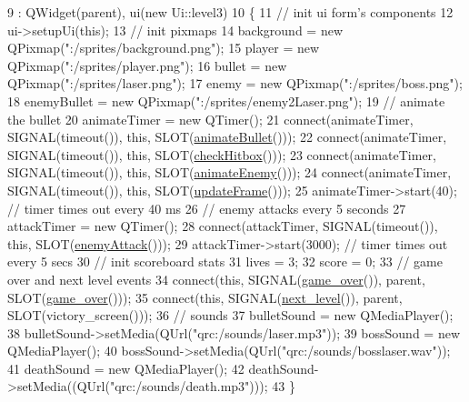 \begin{DoxyCode}
9                               : QWidget(parent), ui(\textcolor{keyword}{new} Ui::level3)
10 \{
11     \textcolor{comment}{// init ui form's components}
12     ui->setupUi(\textcolor{keyword}{this});
13     \textcolor{comment}{// init pixmaps}
14     background = \textcolor{keyword}{new} QPixmap(\textcolor{stringliteral}{":/sprites/background.png"});
15     player = \textcolor{keyword}{new} QPixmap(\textcolor{stringliteral}{":/sprites/player.png"});
16     bullet = \textcolor{keyword}{new} QPixmap(\textcolor{stringliteral}{":/sprites/laser.png"});
17     enemy = \textcolor{keyword}{new} QPixmap(\textcolor{stringliteral}{":/sprites/boss.png"});
18     enemyBullet = \textcolor{keyword}{new} QPixmap(\textcolor{stringliteral}{":/sprites/enemy2Laser.png"});
19     \textcolor{comment}{// animate the bullet}
20     animateTimer = \textcolor{keyword}{new} QTimer();
21     connect(animateTimer, SIGNAL(timeout()), \textcolor{keyword}{this}, SLOT(\hyperlink{classlevel3_a83c0241cb42c34c707758adff87a4b49}{animateBullet}()));
22     connect(animateTimer, SIGNAL(timeout()), \textcolor{keyword}{this}, SLOT(\hyperlink{classlevel3_a8b8f7f12a1fcafc61cb61d73c82ff900}{checkHitbox}()));
23     connect(animateTimer, SIGNAL(timeout()), \textcolor{keyword}{this}, SLOT(\hyperlink{classlevel3_ab413227813899b1d0aefa085ede06df0}{animateEnemy}()));
24     connect(animateTimer, SIGNAL(timeout()), \textcolor{keyword}{this}, SLOT(\hyperlink{classlevel3_a1829c75ea73f9cd85d508609dc07e6d6}{updateFrame}()));
25     animateTimer->start(40); \textcolor{comment}{// timer times out every 40 ms}
26     \textcolor{comment}{// enemy attacks every 5 seconds}
27     attackTimer = \textcolor{keyword}{new} QTimer();
28     connect(attackTimer, SIGNAL(timeout()), \textcolor{keyword}{this}, SLOT(\hyperlink{classlevel3_aa47d3689ec8f682435ac51d8bb01917d}{enemyAttack}()));
29     attackTimer->start(3000); \textcolor{comment}{// timer times out every 5 secs}
30     \textcolor{comment}{// init scoreboard stats}
31     lives = 3;
32     score = 0;
33     \textcolor{comment}{// game over and next level events}
34     connect(\textcolor{keyword}{this}, SIGNAL(\hyperlink{classlevel3_a66c2c618d5faf6c54ab1e88d88496c19}{game\_over}()), parent, SLOT(\hyperlink{classlevel3_a66c2c618d5faf6c54ab1e88d88496c19}{game\_over}()));
35     connect(\textcolor{keyword}{this}, SIGNAL(\hyperlink{classlevel3_a40dafa1371eb8b9f736cfa94d4d7fde6}{next\_level}()), parent, SLOT(victory\_screen()));
36     \textcolor{comment}{// sounds}
37     bulletSound = \textcolor{keyword}{new} QMediaPlayer();
38     bulletSound->setMedia(QUrl(\textcolor{stringliteral}{"qrc:/sounds/laser.mp3"}));
39     bossSound = \textcolor{keyword}{new} QMediaPlayer();
40     bossSound->setMedia(QUrl(\textcolor{stringliteral}{"qrc:/sounds/bosslaser.wav"}));
41     deathSound = \textcolor{keyword}{new} QMediaPlayer();
42     deathSound->setMedia((QUrl(\textcolor{stringliteral}{"qrc:/sounds/death.mp3"})));
43 \}
\end{DoxyCode}


